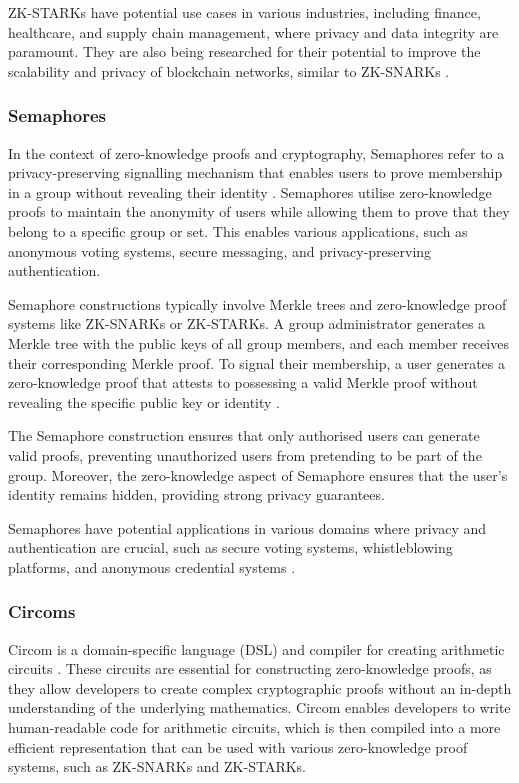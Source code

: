 ZK-STARKs have potential use cases in various industries, including finance, healthcare, and supply chain management, where privacy and data integrity are paramount. They are also being researched for their potential to improve the scalability and privacy of blockchain networks, similar to ZK-SNARKs \cite{maller2019sonic}.

\subsubsection{Semaphores}
In the context of zero-knowledge proofs and cryptography, Semaphores refer to a privacy-preserving signalling mechanism that enables users to prove membership in a group without revealing their identity \cite{bunz2018bulletproofs}. Semaphores utilise zero-knowledge proofs to maintain the anonymity of users while allowing them to prove that they belong to a specific group or set. This enables various applications, such as anonymous voting systems, secure messaging, and privacy-preserving authentication.

Semaphore constructions typically involve Merkle trees and zero-knowledge proof systems like ZK-SNARKs or ZK-STARKs. A group administrator generates a Merkle tree with the public keys of all group members, and each member receives their corresponding Merkle proof. To signal their membership, a user generates a zero-knowledge proof that attests to possessing a valid Merkle proof without revealing the specific public key or identity \cite{idrees2019zkay}.

The Semaphore construction ensures that only authorised users can generate valid proofs, preventing unauthorized users from pretending to be part of the group. Moreover, the zero-knowledge aspect of Semaphore ensures that the user's identity remains hidden, providing strong privacy guarantees.

Semaphores have potential applications in various domains where privacy and authentication are crucial, such as secure voting systems, whistleblowing platforms, and anonymous credential systems \cite{benarroch2020improved}.

\subsubsection{Circoms}
Circom is a domain-specific language (DSL) and compiler for creating arithmetic circuits \cite{jorda2019circom}. These circuits are essential for constructing zero-knowledge proofs, as they allow developers to create complex cryptographic proofs without an in-depth understanding of the underlying mathematics. Circom enables developers to write human-readable code for arithmetic circuits, which is then compiled into a more efficient representation that can be used with various zero-knowledge proof systems, such as ZK-SNARKs and ZK-STARKs.

